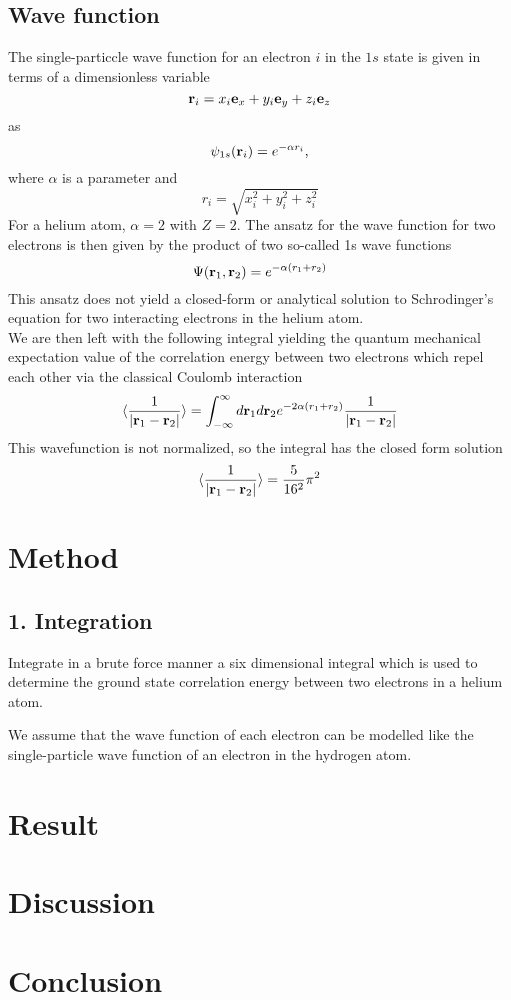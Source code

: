 \documentclass[%
reprint,
amsmath,amssymb,
aps,
]{revtex4-1}
\begin{document}
\subsection{Wave function} \noindent 
The single-particcle wave function for an electron $i$ in the $1s$ state is given in terms of a dimensionless variable 
\begin{equation*}
	 {\bf r}_i =  x_i {\bf e}_x + y_i {\bf e}_y +z_i {\bf e}_z 
\end{equation*}
as 
\begin{equation*}
	\psi_{1s}({\bf r}_i)  =   e^{-\alpha r_i},
\end{equation*}
where $\alpha$ is a parameter and 
\begin{equation*}
	r_i = \sqrt{x_i^2+y_i^2+z_i^2}
\end{equation*}
For a helium atom, $\alpha = 2$ with $Z = 2$. The ansatz for the wave function for two electrons is then given by the product of two so-called 1s wave functions
\begin{equation*}
	\Psi({\bf r}_1,{\bf r}_2)  =   e^{-\alpha (r_1+r_2)}
\end{equation*}
This ansatz does not yield a closed-form or analytical solution to Schrodinger's equation for two interacting electrons in the helium atom. \\
We are then left with the following integral yielding the quantum mechanical expectation value of the correlation energy between two electrons which repel each other via the classical Coulomb interaction
\begin{equation}
	   \langle \frac{1}{|{\bf r}_1-{\bf r}_2|} \rangle =
	\int_{-\infty}^{\infty} d{\bf r}_1d{\bf r}_2  e^{-2\alpha (r_1+r_2)}\frac{1}{|{\bf r}_1-{\bf r}_2|}
\end{equation}
This wavefunction is not normalized, so the integral has the closed form solution 
\begin{equation}
\langle \frac{1}{|{\bf r}_1-{\bf r}_2|} \rangle = \dfrac{5}{16^2}\pi^2
\end{equation}
\vspace{10mm}
\section{Method}
\subsection{1. Integration}
Integrate in a brute force manner a six dimensional integral which is used to determine the ground state correlation energy between two electrons in a helium atom. 

We assume that the wave function of each electron can be modelled like the single-particle wave function of an electron in the hydrogen atom. 

\section{Result}
\section{Discussion}
\section{Conclusion }
\end{document}
